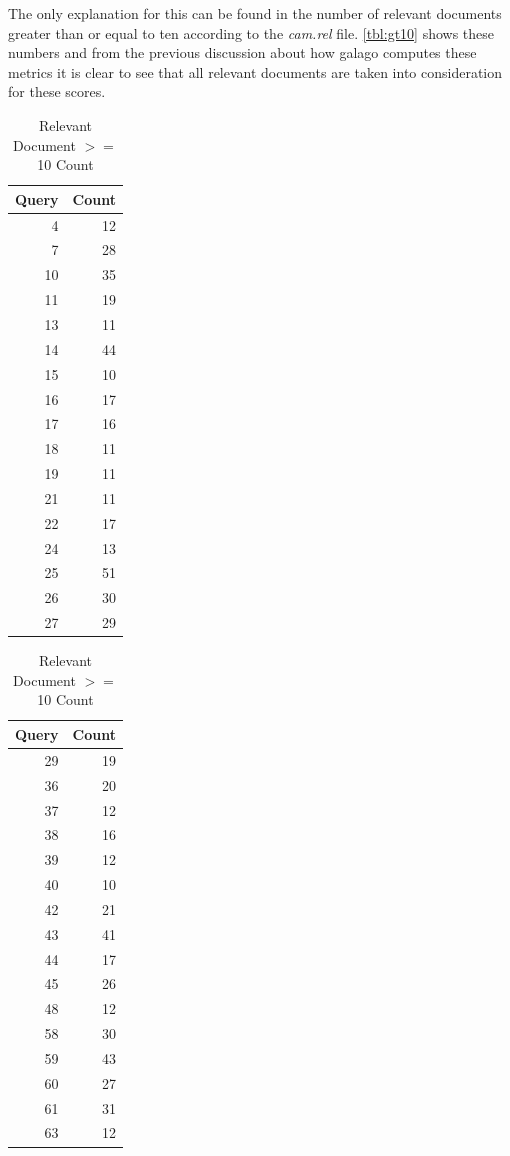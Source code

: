 \documentclass[11pt]{article}
\begin{document}
The only explanation for this can be found in the number of relevant documents greater than or equal to ten according to the \textit{cam.rel} file. \autoref{tbl:gt10} shows these numbers and from the previous discussion about how galago computes these metrics it is clear to see that all relevant documents are taken into consideration for these scores. 
\begin{table}[H]
\caption{Relevant Document $>=$ 10 Count }
\begin{minipage}{.5\linewidth}
\centering
       \begin{tabular}{rr}
  \hline
 Query & Count \\ 
  \hline
4 &  12 \\ 
   7 &  28 \\ 
  10 &  35 \\ 
  11 &  19 \\ 
  13 &  11 \\ 
  14 &  44 \\ 
  15 &  10 \\ 
  16 &  17 \\ 
  17 &  16 \\ 
  18 &  11 \\ 
  19 &  11 \\ 
  21 &  11 \\ 
  22 &  17 \\ 
  24 &  13 \\ 
  25 &  51 \\ 
  26 &  30 \\ 
  27 &  29 \\ 
   \hline
\end{tabular}
    \end{minipage}%
    \centering
    \begin{minipage}{.5\linewidth}
       \begin{tabular}{rr}
  \hline
 Query & Count \\ 
  \hline
    29 &  19 \\ 
  36 &  20 \\ 
  37 &  12 \\ 
 38 &  16 \\ 
  39 &  12 \\ 
  40 &  10 \\ 
  42 &  21 \\ 
  43 &  41 \\ 
  44 &  17 \\ 
  45 &  26 \\ 
  48 &  12 \\ 
  58 &  30 \\ 
  59 &  43 \\ 
  60 &  27 \\ 
  61 &  31 \\ 
  63 &  12 \\ 
   \hline
\end{tabular}
    \end{minipage} 
\label{tbl:gt10}
\end{table}
\end{document}
